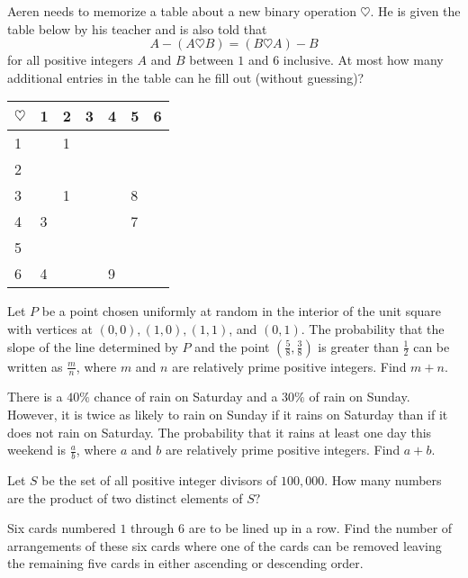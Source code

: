 \documentclass[mast]{lucky}
\begin{document}
\begin{prob}{3}
Aeren needs to memorize a table about a new binary operation $\heartsuit$. He is given the table below by his teacher and is also told that
\[A - (A \heartsuit B) = (B \heartsuit A) - B\]for all positive integers $A$ and $B$ between $1$ and $6$ inclusive. At most how many additional entries in the table can he fill out (without guessing)?
\begin{center}
\begin{tabular}{l|llllll} $\heartsuit$ & 1 & 2 & 3 & 4 & 5 & 6 \\ \hline 1 & & 1 & & & & \\ 2 & & & & & & \\ 3 & & 1 & & & 8 & \\ 4 & 3 & & & & 7 & \\ 5 & & & & & & \\ 6 & 4 & & & 9 & & \end{tabular}
\end{center}

\end{prob}

\begin{prob}[AIME II 2020/2]{3}
Let $P$ be a point chosen uniformly at random in the interior of the unit square with vertices at $(0,0), (1,0), (1,1)$, and $(0,1)$. The probability that the slope of the line determined by $P$ and the point $\left(\frac58, \frac38 \right)$ is greater than $\frac12$ can be written as $\frac{m}{n}$, where $m$ and $n$ are relatively prime positive integers. Find $m+n$.
\end{prob}

\begin{prob}[AIME II 2016/2]{4}
There is a $40\%$ chance of rain on Saturday and a $30\%$ of rain on Sunday. However, it is twice as likely to rain on Sunday if it rains on Saturday than if it does not rain on Saturday. The probability that it rains at least one day this weekend is $\frac{a}{b}$, where $a$ and $b$ are relatively prime positive integers. Find $a+b$.
\end{prob}

\begin{prob}[AMC 12B 2019/14]{4}
Let $S$ be the set of all positive integer divisors of $100,000.$ How many numbers are the product of two distinct elements of $S?$
\end{prob}

\begin{prob}[AIME I 2020/5]{4}
Six cards numbered $1$ through $6$ are to be lined up in a row. Find the number of arrangements of these six cards where one of the cards can be removed leaving the remaining five cards in either ascending or descending order.
\end{prob}
\end{document}
